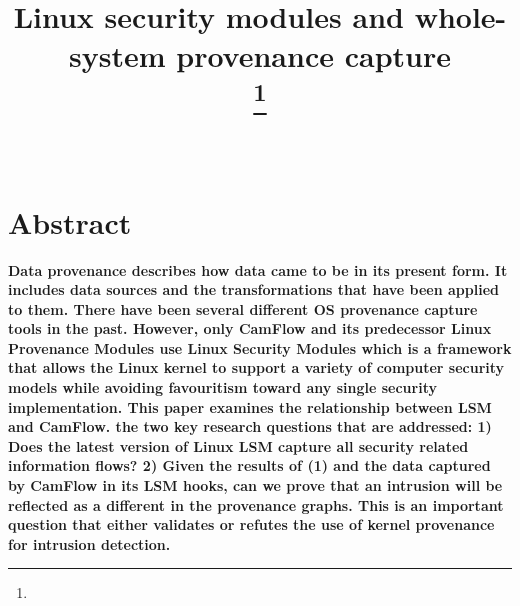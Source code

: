 \documentclass{IEEEtran}
\begin{document}
\title{Linux security modules and whole-system provenance capture\\
{\footnotesize}
\thanks{}
}

\author{ \\


}

\maketitle

\section*{Abstract}
	 \textbf{Data provenance describes how data came to be in its present form. It includes data sources and the transformations that have been applied to them. There have been several different OS provenance capture tools in the past. However, only CamFlow and its predecessor Linux Provenance Modules use Linux Security Modules which is a  framework  that allows the Linux kernel to support a variety of computer security models while avoiding favouritism toward any single security implementation. This paper examines the relationship between LSM and CamFlow. the two key research questions that are addressed: 1) Does
	 the latest version of Linux LSM capture all security related information flows? 2) Given the results of (1) and the data captured by CamFlow in its LSM hooks, can we prove that an intrusion will be reflected as a different in the provenance graphs. This is an important question that either validates or refutes the use of kernel provenance for intrusion detection.}









\end{document}
